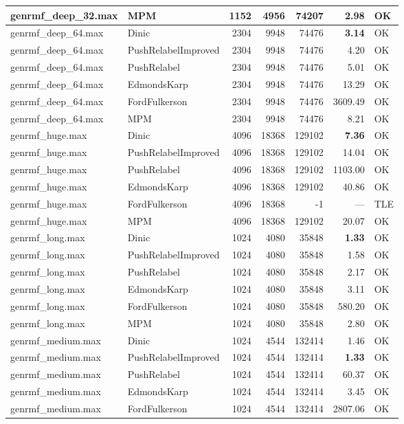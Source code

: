 \begin{longtable}{llrrrrl}
genrmf\_deep\_32.max & MPM & 1152 & 4956 & 74207 & 2.98 & OK \\
\midrule
genrmf\_deep\_64.max & Dinic & 2304 & 9948 & 74476 & \textbf{3.14} & OK \\
genrmf\_deep\_64.max & PushRelabelImproved & 2304 & 9948 & 74476 & 4.20 & OK \\
genrmf\_deep\_64.max & PushRelabel & 2304 & 9948 & 74476 & 5.01 & OK \\
genrmf\_deep\_64.max & EdmondsKarp & 2304 & 9948 & 74476 & 13.29 & OK \\
genrmf\_deep\_64.max & FordFulkerson & 2304 & 9948 & 74476 & 3609.49 & OK \\
genrmf\_deep\_64.max & MPM & 2304 & 9948 & 74476 & 8.21 & OK \\
\midrule
genrmf\_huge.max & Dinic & 4096 & 18368 & 129102 & \textbf{7.36} & OK \\
genrmf\_huge.max & PushRelabelImproved & 4096 & 18368 & 129102 & 14.04 & OK \\
genrmf\_huge.max & PushRelabel & 4096 & 18368 & 129102 & 1103.00 & OK \\
genrmf\_huge.max & EdmondsKarp & 4096 & 18368 & 129102 & 40.86 & OK \\
genrmf\_huge.max & FordFulkerson & 4096 & 18368 & -1 & --- & TLE \\
genrmf\_huge.max & MPM & 4096 & 18368 & 129102 & 20.07 & OK \\
\midrule
genrmf\_long.max & Dinic & 1024 & 4080 & 35848 & \textbf{1.33} & OK \\
genrmf\_long.max & PushRelabelImproved & 1024 & 4080 & 35848 & 1.58 & OK \\
genrmf\_long.max & PushRelabel & 1024 & 4080 & 35848 & 2.17 & OK \\
genrmf\_long.max & EdmondsKarp & 1024 & 4080 & 35848 & 3.11 & OK \\
genrmf\_long.max & FordFulkerson & 1024 & 4080 & 35848 & 580.20 & OK \\
genrmf\_long.max & MPM & 1024 & 4080 & 35848 & 2.80 & OK \\
\midrule
genrmf\_medium.max & Dinic & 1024 & 4544 & 132414 & 1.46 & OK \\
genrmf\_medium.max & PushRelabelImproved & 1024 & 4544 & 132414 & \textbf{1.33} & OK \\
genrmf\_medium.max & PushRelabel & 1024 & 4544 & 132414 & 60.37 & OK \\
genrmf\_medium.max & EdmondsKarp & 1024 & 4544 & 132414 & 3.45 & OK \\
genrmf\_medium.max & FordFulkerson & 1024 & 4544 & 132414 & 2807.06 & OK \\

\end{longtable}
